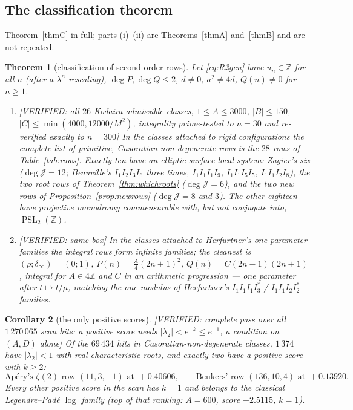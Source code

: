 \documentclass[11pt,reqno]{amsart}
\theoremstyle{plain}
\newtheorem{theorem}{Theorem}[section]
\newtheorem{corollary}[theorem]{Corollary}
\theoremstyle{definition}
\theoremstyle{remark}
\theoremstyle{plain}
\newcommand{\Z}{\mathbb{Z}}
\DeclareMathOperator{\PSL}{PSL}
\newcommand{\VerifiedR}[1]{\textup{\textsf{[VERIFIED: #1]}}}
\begin{document}
\subsection{The classification theorem}

Theorem~\ref{thmC} in full; parts (i)--(ii) are Theorems~\ref{thmA}
and~\ref{thmB} and are not repeated.

\begin{theorem}[classification of second-order rows]\label{thm:herfclass}
Let \eqref{eq:R2gen} have $u_n\in\Z$ for all $n$ \textup{(}after a $\lambda^n$
rescaling\textup{)}, $\deg P,\deg Q\le2$, $d\neq0$, $a^2\neq4d$, $Q(n)\neq0$ for
$n\ge1$.
\begin{enumerate}[label=\textup{(\roman*)},leftmargin=2.6em,start=3]
\item \VerifiedR{all $26$ Kodaira-admissible classes, $1\le A\le3000$,
$|B|\le150$, $|C|\le\min(4000,12000/M^2)$, integrality prime-tested to $n=30$ and
re-verified exactly to $n=300$} In the classes attached to \emph{rigid}
configurations the complete list of primitive, Casoratian-non-degenerate rows is
the $28$ rows of Table~\ref{tab:rows}. Exactly ten have an elliptic-surface local
system: Zagier's six ($\deg\mathcal J=12$; Beauville's $I_1I_2I_3I_6$ three
times, $I_1I_1I_1I_9$, $I_1I_1I_5I_5$, $I_1I_1I_2I_8$), the two root rows of
Theorem~\ref{thm:whichroots} ($\deg\mathcal J=6$), and the two new rows of
Proposition~\ref{prop:newrows} ($\deg\mathcal J=8$ and $3$). The other eighteen
have projective monodromy commensurable with, but not conjugate into,
$\PSL_2(\Z)$.
\item \VerifiedR{same box} In the classes attached to Herfurtner's
\emph{one-parameter} families the integral rows form infinite families; the
cleanest is $(\rho;\delta_\infty)=(0;1)$, $P(n)=\tfrac A4(2n+1)^2$,
$Q(n)=C(2n-1)(2n+1)$, integral for $A\in4\Z$ and $C$ in an arithmetic
progression --- one parameter after $t\mapsto t/\mu$, matching the one modulus of
Herfurtner's $I_1I_1I_1I_3^*$ / $I_1I_1I_2I_2^*$ families.
\end{enumerate}
\end{theorem}

\begin{corollary}[the only positive scores]\label{cor:H6}
\VerifiedR{complete pass over all $1\,270\,065$ scan hits: a positive score needs
$|\lambda_2|<e^{-k}\le e^{-1}$, a condition on $(A,D)$ alone}
Of the $69\,434$ hits in Casoratian-non-degenerate classes, $1\,374$ have
$|\lambda_2|<1$ with real characteristic roots, and \emph{exactly two} have a
positive score with $k\ge2$:
\[
\text{Ap\'ery's }\zeta(2)\text{ row }(11,3,-1)\text{ at }+0.40606,\qquad
\text{Beukers' row }(136,10,4)\text{ at }+0.13920 .
\]
Every other positive score in the scan has $k=1$ and belongs to the classical
Legendre--Pad\'e $\log$ family (top of that ranking: $A=600$, score $+2.5115$,
$k=1$).
\end{corollary}
\end{document}
